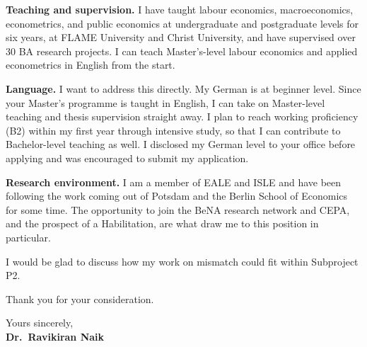 \documentclass[11pt,english]{article}
\begin{document}
\vspace{0.1in}

\textbf{Teaching and supervision.}
I have taught labour economics, macroeconomics, econometrics, and public economics at undergraduate and postgraduate levels for six years, at FLAME University and Christ University, and have supervised over 30 BA research projects. I can teach Master's-level labour economics and applied econometrics in English from the start.

\vspace{0.1in}

\textbf{Language.}
I want to address this directly. My German is at beginner level. Since your Master's programme is taught in English, I can take on Master-level teaching and thesis supervision straight away. I plan to reach working proficiency (B2) within my first year through intensive study, so that I can contribute to Bachelor-level teaching as well. I disclosed my German level to your office before applying and was encouraged to submit my application.

\vspace{0.1in}

\textbf{Research environment.}
I am a member of EALE and ISLE and have been following the work coming out of Potsdam and the Berlin School of Economics for some time. The opportunity to join the BeNA research network and CEPA, and the prospect of a Habilitation, are what draw me to this position in particular.

\vspace{0.1in}

I would be glad to discuss how my work on mismatch could fit within Subproject P2.

Thank you for your consideration.

\vspace{0.2in}

Yours sincerely, \\
\textbf{Dr.\ Ravikiran Naik}
\end{document}
